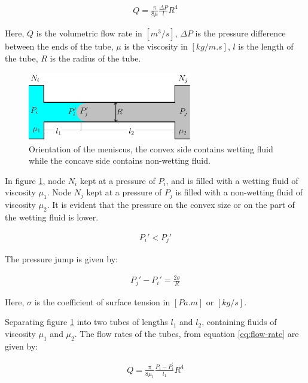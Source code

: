 \documentclass{crm-article}
\begin{document}
		\begin{gather} \label{eq:flow-rate}
			Q = \frac{\pi}{8\mu} \frac{\Delta P}{l} R^4
		\end{gather}
		
		Here, $Q$ is the volumetric flow rate in $[m^3/s]$, $\Delta P$ is the pressure difference between the ends of the tube, $\mu$ is the viscosity in $[kg/m.s]$, $l$ is the length of the tube, $R$ is the radius of the tube.
		
		\begin{figure}[H]
			\centering
			\includegraphics[height=3cm]{fig_capillary_pressure_in_tube_1mns_blue}
			\caption{Orientation of the meniscus, the convex side contains wetting fluid while the concave side contains non-wetting fluid.}
			\label{fig_capillary_pressure_in_tube_1mns_blue}
		\end{figure}
		
		In figure \ref{fig_capillary_pressure_in_tube_1mns_blue}, node $N_{i}$ kept at a pressure of $P_{i}$, and is filled with a wetting fluid of viscosity $\mu_{1}$. Node $N_{j}$ kept at a pressure of $P_{j}$ is filled with a non-wetting fluid of viscosity $\mu_{2}$. It is evident that the pressure on the convex size or on the part of the wetting fluid is lower.
		
		\begin{gather}
			P_{i}' < P_{j}'
		\end{gather}
		
		The pressure jump is given by:
		
		\begin{gather} \label{eq:capillary_pressure_mns}
			P_{j}' - P_{i}' = \frac{2 \sigma}{R}
		\end{gather}
		
		Here, $\sigma$ is the coefficient of surface tension in $[Pa.m]$ or $[kg/s]$.
		
		Separating figure \ref{fig_capillary_pressure_in_tube_1mns_blue} into two tubes of lengths $l_{1}$ and $l_{2}$, containing fluids of viscosity ${\mu}_1$ and ${\mu}_2$. The flow rates of the tubes, from equation \ref{eq:flow-rate} are given by:
		
		\begin{gather} \label{eq:flow-rate-first}
			Q = \frac{\pi}{8{\mu}_1} \frac{P_i - P^{'}_i}{l_1} R^4
		\end{gather}
		
\end{document}
